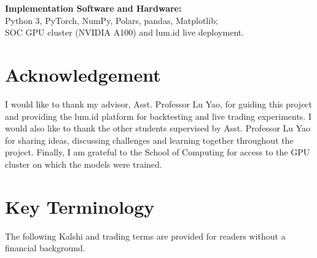 \documentclass[12pt,a4paper,oneside]{report}
\begin{document}
\vspace{0.6em}
\noindent\textbf{Implementation Software and Hardware:}\\[2pt]
\hspace*{1.2cm}Python 3, PyTorch, NumPy, Polars, pandas, Matplotlib;\\
\hspace*{1.2cm}SOC GPU cluster (NVIDIA A100) and lum.id live deployment.
\onehalfspacing

\chapter*{Acknowledgement}
\doublespacing
I would like to thank my advisor, Asst. Professor Lu Yao, for guiding this 
project and providing the lum.id platform for backtesting and live trading experiments. 
I would also like to thank the other students supervised by Asst. Professor Lu Yao for sharing ideas, 
discussing challenges and learning together throughout the project. Finally, I am grateful to 
the School of Computing for access to the GPU cluster on which the models were trained.
\onehalfspacing

\singlespacing
\tableofcontents
\clearpage
{}
\listoffigures
\clearpage
{}
\listoftables
\onehalfspacing

\clearpage
\chapter*{Key Terminology}\label{sec:terms}
The following Kalshi and trading terms are provided for readers without a
financial background.
\end{document}
